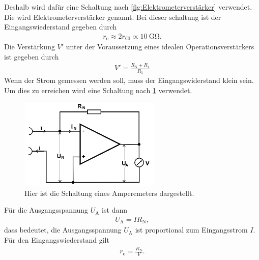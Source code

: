 Deshalb wird dafür eine Schaltung nach \cref{fig:Elektrometerverstärker} verwendet.
Die wird Elektrometerverstärker genannt.
Bei dieser schaltung ist der Eingangswiederstand gegeben durch
\begin{align}
	r_\text{e}\approx 2r_\text{Gl}\propto \SI{10}{\giga\ohm}.
\end{align}
Die Verstärkung $V'$ unter der Voraussetzung eines idealen Operationsverstärkers ist gegeben durch
\begin{align}
	V'=\frac{R_\text{N}+R_1}{R_1 }
\end{align}
Wenn der Strom gemessen werden soll, muss der Eingangswiderstand klein sein.
Um dies zu erreichen wird eine Schaltung nach \cref{fig:Amperemeter} verwendet.
\begin{figure}[h!]
	\centering
	\includegraphics[width = 0.6\textwidth]{../Grafiken/Amperemeter.png}
	\caption{Hier ist die Schaltung eines Amperemeters dargestellt. \cite{V51}\label{fig:Amperemeter}}
\end{figure}
Für die Ausgangsspannung $U_\text{A}$ ist dann
\begin{align}
	U_\text{A}=IR_\text{N},
\end{align}
dass bedeutet, die Ausgangsspannung $U_\text{A}$ ist proportional zum Eingangsstrom $I$.
Für den Eingangswiederstand gilt\\
\begin{align*}
	r_\text{e}=\frac{R_\text{N}}{V}.
\end{align*}
